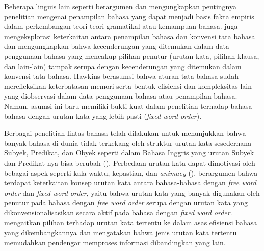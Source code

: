 Beberapa linguis lain seperti \cite{sagwasow2011pccg} berargumen dan mengungkapkan pentingnya penelitian mengenai penampilan bahasa yang dapat menjadi basis fakta empiris dalam perkembangan teori-teori gramatikal atau kemampuan bahasa. \cite{hawkins2014cross} juga mengeksplorasi keterkaitan antara penampilan bahasa dan konvensi tata bahasa dan mengungkapkan bahwa kecenderungan yang ditemukan dalam data penggunaan bahasa yang mencakup pilihan penutur (urutan kata, pilihan klausa, dan lain-lain) tampak serupa dengan kecenderungan yang ditemukan dalam konvensi tata bahasa. Hawkins berasumsi bahwa aturan tata bahasa sudah merefleksikan keterbatasan memori serta bentuk efisiensi dan kompleksitas lain yang diobservasi dalam data penggunaan bahasa atau penampilan bahasa. Namun, asumsi ini baru memiliki bukti kuat dalam penelitian terhadap bahasa-bahasa dengan urutan kata yang lebih pasti (\textit{fixed word order}). 

Berbagai penelitian lintas bahasa telah dilakukan untuk menunjukkan bahwa banyak bahasa di dunia tidak terkekang oleh struktur urutan kata sesederhana Subyek, Predikat, dan Obyek seperti dalam Bahasa Inggris yang urutan Subyek dan Predikat-nya bisa berubah (\citealp{macwhinneybates1989cross, birnerward1998noncanonical, lambrecht2000info}). Perbedaan urutan kata dapat dimotivasi oleh bebagai aspek seperti kala waktu, kepastian, dan \textit{animacy} (\citealp{dryer1992greenbergian, tsunoda1995adpositions, polinskaja1989object}).  \cite{hawkins1994performance} berargumen bahwa terdapat keterkaitan konsep urutan kata antara bahasa-bahasa dengan \textit{free word order} dan \textit{fixed word order}, yaitu bahwa urutan kata yang banyak digunakan oleh penutur pada bahasa dengan \textit{free word order} serupa dengan urutan kata yang dikonvensionalisasikan secara aktif pada bahasa dengan \textit{fixed word order}. \cite{hawkins1994performance} mengaitkan pilihan terhadap urutan kata tertentu ke dalam asas efisiensi bahasa yang dikembangkannya dan mengatakan bahwa jenis urutan kata tertentu memudahkan pendengar memproses informasi dibandingkan yang lain.

